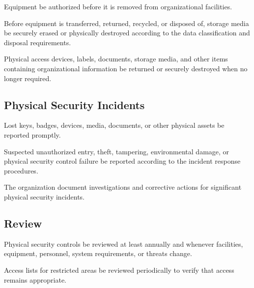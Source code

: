 Equipment \must{} be authorized before it is removed from organizational facilities.

Before equipment is transferred, returned, recycled, or disposed of, storage media \must{} be securely erased or physically destroyed according to the data classification and disposal requirements.

Physical access devices, labels, documents, storage media, and other items containing organizational information \must{} be returned or securely destroyed when no longer required.

\subsection{Physical Security Incidents}

Lost keys, badges, devices, media, documents, or other physical assets \must{} be reported promptly.

Suspected unauthorized entry, theft, tampering, environmental damage, or physical security control failure \must{} be reported according to the incident response procedures.

The organization \should{} document investigations and corrective actions for significant physical security incidents.

\subsection{Review}

Physical security controls \should{} be reviewed at least annually and whenever facilities, equipment, personnel, system requirements, or threats change.

Access lists for restricted areas \must{} be reviewed periodically to verify that access remains appropriate.
